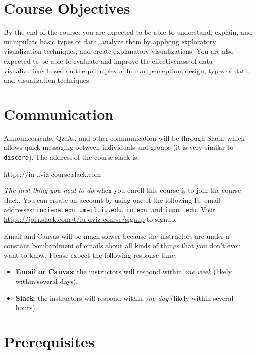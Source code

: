 \documentclass[11pt,article,oneside]{memoir} %
\begin{document}
\section{Course Objectives}%

By the end of the course, you are expected to be able to understand, explain, and manipulate basic types of data, analyze them by applying exploratory visualization techniques, and create explanatory visualizations. 
You are also expected to be able to evaluate and improve the effectiveness of data visualizations based on the principles of human perception, design, types of data, and visualization techniques. 
 

\section{Communication} %

Announcements, Q\&As, and other communication will be through Slack, which allows quick messaging between individuals and groups (it is very similar to \texttt{discord}). The address of the course slack is: 

\url{https://iu-dviz-course.slack.com}

\emph{The first thing you need to do} when you enroll this course is to join the course slack. You can create an account by using one of the following IU email addresses: \texttt{indiana.edu}, \texttt{umail.iu.edu}, \texttt{iu.edu}, and \texttt{iupui.edu}. Visit \url{https://join.slack.com/t/iu-dviz-course/signup} to signup.

Email and Canvas will be much slower because the instructors are under a constant bombardment of emails about all kinds of things that you don't even want to know. Please expect the following response time:

\begin{itemize}
\item \textbf{Email or Canvas}: the instructors will respond within \emph{one week} (likely within several days).
\item \textbf{Slack}: the instructors will respond within \emph{one day} (likely within several hours).

\end{itemize}

\section{Prerequisites}%
\label{sec:Prerequisites}
\end{document}
